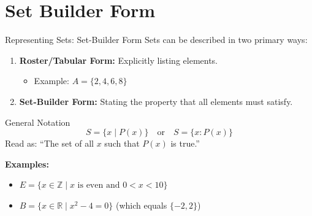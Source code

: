 \documentclass{beamer}
\begin{document}
\section{Set Builder Form}
\begin{frame}{Representing Sets: Set-Builder Form}
    Sets can be described in two primary ways:
    \begin{enumerate}
        \item \textbf{Roster/Tabular Form:} Explicitly listing elements.
        \begin{itemize}
            \item Example: $A = \{2, 4, 6, 8\}$
        \end{itemize}
        \item \textbf{Set-Builder Form:} Stating the property that all elements must satisfy.
    \end{enumerate}

    \vspace{0.3cm}
    \begin{block}{General Notation}
        \[ S = \{ x \mid P(x) \} \quad \text{or} \quad S = \{ x : P(x) \} \]
        \small{Read as: ``The set of all $x$ such that $P(x)$ is true.''}
    \end{block}

    \textbf{Examples:}
    \begin{itemize}
        \item $E = \{ x \in \mathbb{Z} \mid x \text{ is even and } 0 < x < 10 \}$
        \item $B = \{ x \in \mathbb{R} \mid x^2 - 4 = 0 \}$ (which equals $\{-2, 2\}$)
    \end{itemize}
\end{frame}

\end{document}
